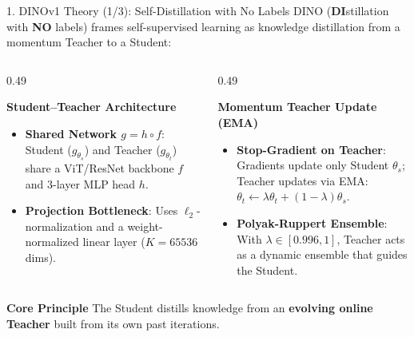 \documentclass[aspectratio=169,10pt]{beamer}
\begin{document}
\begin{frame}{1. DINOv1 Theory (1/3): Self-Distillation with No Labels}
\vspace{-0.4em}
DINO (\textbf{DI}stillation with \textbf{NO} labels) frames self-supervised learning as knowledge distillation from a momentum Teacher to a Student:

\vspace{0.2em}
\begin{columns}[t]
    \begin{column}{0.49\textwidth}
        \begin{block}{\textbf{Student--Teacher Architecture}}
            \small
            \begin{itemize}\setlength{\itemsep}{2pt}
                \item \textbf{Shared Network $g = h \circ f$}: Student ($g_{\theta_s}$) and Teacher ($g_{\theta_t}$) share a ViT/ResNet backbone $f$ and 3-layer MLP head $h$.
                \item \textbf{Projection Bottleneck}: Uses $\ell_2$-normalization and a weight-normalized linear layer ($K = 65536$ dims).
            \end{itemize}
        \end{block}
    \end{column}

    \begin{column}{0.49\textwidth}
        \begin{block}{\textbf{Momentum Teacher Update (EMA)}}
            \small
            \begin{itemize}\setlength{\itemsep}{2pt}
                \item \textbf{Stop-Gradient on Teacher}: Gradients update only Student $\theta_s$; Teacher updates via EMA: $\theta_t \leftarrow \lambda \theta_t + (1 - \lambda) \theta_s$.
                \item \textbf{Polyak-Ruppert Ensemble}: With $\lambda \in [0.996, 1]$, Teacher acts as a dynamic ensemble that guides the Student.
            \end{itemize}
        \end{block}
    \end{column}
\end{columns}

\vspace{0.3em}
\begin{exampleblock}{\textbf{Core Principle}}
    \centering\small
    The Student distills knowledge from an \textbf{evolving online Teacher} built from its own past iterations.
\end{exampleblock}
\end{frame}
\end{document}
